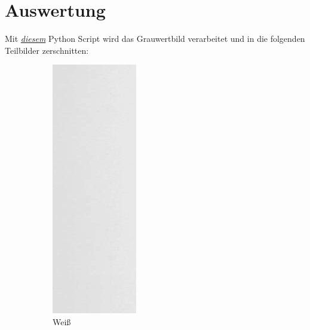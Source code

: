 \documentclass[12pt, oneside, a4paper, \docLanguage]{report}
\begin{document}
\section{Auswertung}
\label{chap:VERSUCH_1_AUSWERTUNG}
\begin{normalsize}
Mit \hyperref[chap:APPENDIX_SOURCECODE_V1]{\textit{diesem}} Python Script wird das Grauwertbild verarbeitet und in die folgenden Teilbilder zerschnitten:
\end{normalsize}
\begin{figure}[H]
\centering
\begin{subfigure}{.35\textwidth}
  \centering
  \includegraphics[width=.35\linewidth]{../whiteSlice.png}
  \caption{Weiß}
  \label{fig:sub1}
\end{subfigure}
\begin{subfigure}{.35\textwidth}
  \centering

\end{subfigure}
\end{figure}
\end{document}
